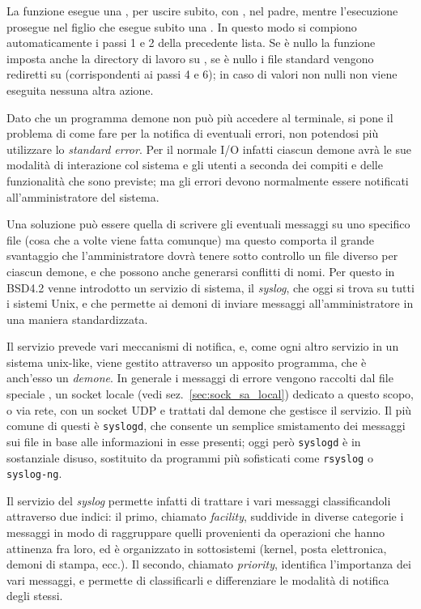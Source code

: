 La funzione esegue una , per uscire subito, con , nel
padre, mentre l'esecuzione prosegue nel figlio che esegue subito una
. In questo modo si compiono automaticamente i passi 1 e 2 della
precedente lista. Se  è nullo la funzione imposta anche la
directory di lavoro su \file{/}, se  è nullo i file standard
vengono rediretti su  (corrispondenti ai passi 4 e 6); in caso
di valori non nulli non viene eseguita nessuna altra azione.

Dato che un programma demone non può più accedere al terminale, si pone il
problema di come fare per la notifica di eventuali errori, non potendosi più
utilizzare lo \textit{standard error}. Per il normale I/O infatti ciascun
demone avrà le sue modalità di interazione col sistema e gli utenti a seconda
dei compiti e delle funzionalità che sono previste; ma gli errori devono
normalmente essere notificati all'amministratore del sistema.


Una soluzione può essere quella di scrivere gli eventuali messaggi su uno
specifico file (cosa che a volte viene fatta comunque) ma questo comporta il
grande svantaggio che l'amministratore dovrà tenere sotto controllo un file
diverso per ciascun demone, e che possono anche generarsi conflitti di nomi.
Per questo in BSD4.2 venne introdotto un servizio di sistema, il
\textit{syslog}, che oggi si trova su tutti i sistemi Unix, e che permette ai
demoni di inviare messaggi all'amministratore in una maniera standardizzata.

Il servizio prevede vari meccanismi di notifica, e, come ogni altro servizio
in un sistema unix-like, viene gestito attraverso un apposito programma, che è
anch'esso un \textsl{demone}. In generale i messaggi di errore vengono
raccolti dal file speciale , un socket locale (vedi
sez.~\ref{sec:sock_sa_local}) dedicato a questo scopo, o via rete, con un
socket UDP e trattati dal demone che gestisce il servizio. Il più comune di
questi è \texttt{syslogd}, che consente un semplice smistamento dei messaggi
sui file in base alle informazioni in esse presenti; oggi però
\texttt{syslogd} è in sostanziale disuso, sostituito da programmi più
sofisticati come \texttt{rsyslog} o \texttt{syslog-ng}.

Il servizio del \textit{syslog} permette infatti di trattare i vari messaggi
classificandoli attraverso due indici: il primo, chiamato \textit{facility},
suddivide in diverse categorie i messaggi in modo di raggruppare quelli
provenienti da operazioni che hanno attinenza fra loro, ed è organizzato in
sottosistemi (kernel, posta elettronica, demoni di stampa, ecc.). Il secondo,
chiamato \textit{priority}, identifica l'importanza dei vari messaggi, e
permette di classificarli e differenziare le modalità di notifica degli
stessi.

